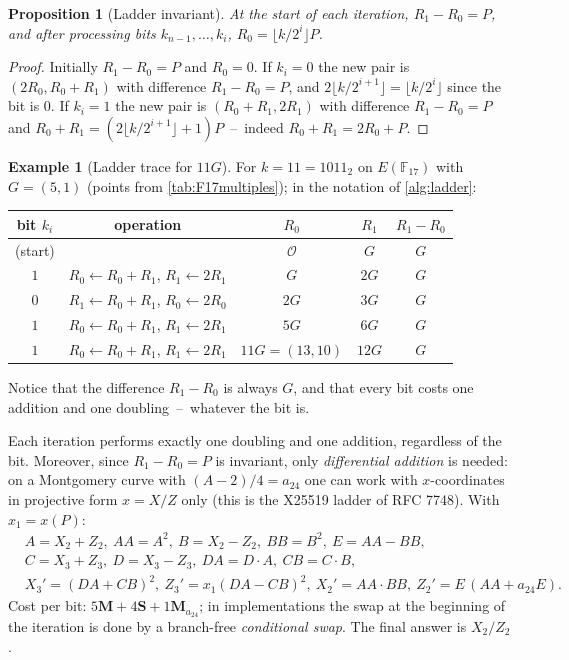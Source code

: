 \documentclass[11pt,a4paper,oneside]{book}
\theoremstyle{plain}
\newtheorem{proposition}[theorem]{Proposition}
\theoremstyle{definition}
\newtheorem{example}[theorem]{Example}
\theoremstyle{remark}
\newcommand{\F}{\mathbb{F}}
\newcommand{\Oinf}{\mathcal{O}}
\newcommand{\Mul}{\mathbf{M}}
\newcommand{\Sqr}{\mathbf{S}}
\begin{document}
\begin{proposition}[Ladder invariant]\label{prop:ladder}
At the start of each iteration, $R_1-R_0=P$, and after processing bits $k_{n-1},\dots,k_i$, $R_0=\lfloor k/2^i\rfloor P$.
\end{proposition}
\begin{proof}
Initially $R_1-R_0=P$ and $R_0=0$. If $k_i=0$ the new pair is $(2R_0,R_0+R_1)$ with difference $R_1-R_0=P$, and $2\lfloor k/2^{i+1}\rfloor=\lfloor k/2^i\rfloor$ since the bit is $0$. If $k_i=1$ the new pair is $(R_0+R_1,2R_1)$ with difference $R_1-R_0=P$ and $R_0+R_1=(2\lfloor k/2^{i+1}\rfloor+1)P$ \,--\, indeed $R_0+R_1=2R_0+P$.
\end{proof}

\begin{example}[Ladder trace for $11G$]
For $k=11=1011_2$ on $E(\F_{17})$ with $G=(5,1)$ (points from \cref{tab:F17multiples}); in the notation of \cref{alg:ladder}:
\begin{center}
\small
\begin{tabular}{@{}ccccc@{}}
\toprule
bit $k_i$ & operation & $R_0$ & $R_1$ & $R_1-R_0$\\
\midrule
(start) & & $\Oinf$ & $G$ & $G$\\
$1$ & $R_0\gets R_0+R_1$, $R_1\gets2R_1$ & $G$ & $2G$ & $G$\\
$0$ & $R_1\gets R_0+R_1$, $R_0\gets2R_0$ & $2G$ & $3G$ & $G$\\
$1$ & $R_0\gets R_0+R_1$, $R_1\gets2R_1$ & $5G$ & $6G$ & $G$\\
$1$ & $R_0\gets R_0+R_1$, $R_1\gets2R_1$ & $11G=(13,10)$ & $12G$ & $G$\\
\bottomrule
\end{tabular}
\end{center}
Notice that the difference $R_1-R_0$ is always $G$, and that every bit costs one addition and one doubling \,--\, whatever the bit is.
\end{example}

Each iteration performs exactly one doubling and one addition, regardless of the bit.
Moreover, since $R_1-R_0=P$ is invariant, only \emph{differential addition} is needed: on a Montgomery curve with $(A-2)/4=a_{24}$ one can work with $x$-coordinates in projective form $x=X/Z$ only (this is the X25519 ladder of RFC 7748). With $x_1=x(P)$:
\begin{align*}
&A=X_2+Z_2,\ AA=A^2,\ B=X_2-Z_2,\ BB=B^2,\ E=AA-BB,\\
&C=X_3+Z_3,\ D=X_3-Z_3,\ DA=D\cdot A,\ CB=C\cdot B,\\
&X_3'=(DA+CB)^2,\ Z_3'=x_1(DA-CB)^2,\ X_2'=AA\cdot BB,\ Z_2'=E\,(AA+a_{24}E).
\end{align*}
Cost per bit: $5\Mul+4\Sqr+1\Mul_{a_{24}}$; in implementations the swap at the beginning of the iteration is done by a branch-free \emph{conditional swap}. The final answer is $X_2/Z_2$.
\end{document}

